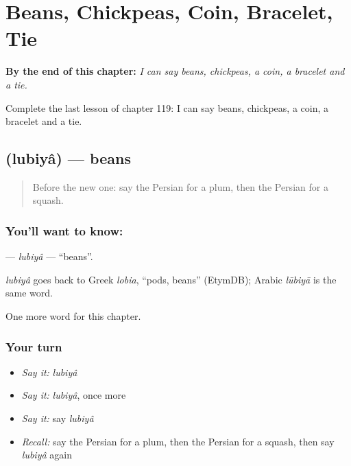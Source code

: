 
\chapter{Beans, Chickpeas, Coin, Bracelet, Tie}
\label{ch:fa-beans-chickpeas-coin-bracelet-tie}

\begin{chapteropening}
\textbf{By the end of this chapter:} \emph{I can say beans, chickpeas, a coin, a bracelet and a tie.}

Complete the last lesson of chapter 119: I can say beans, chickpeas, a coin, a bracelet and a tie.
\end{chapteropening}

\section[\texorpdfstring{\fa{لوبیا} (lubiyâ)}{لوبیا (lubiyâ)}]{ (lubiyâ) — beans}

\label{lesson:FA-C119-lubiya}



\begin{quote}
Before the new one: say the Persian for a plum, then the Persian for a squash.
\end{quote}

\subsection*{You'll want to know: }
\textbf{} — \emph{lubiyâ} — \textquotedblleft{}beans\textquotedblright{}.

\begin{cousinweb}
\emph{lubiyâ} goes back to Greek \emph{lobia}, \textquotedblleft{}pods, beans\textquotedblright{} (EtymDB); Arabic \emph{lūbiyā} is the same word.
\end{cousinweb}

\begin{grammarlens}[title={What you've built}]
One more word for this chapter.
\end{grammarlens}

\subsection*{Your turn}
\begin{itemize}
\raggedright
  \item \emph{Say it:} \emph{lubiyâ}
  \item \emph{Say it:} \emph{lubiyâ}, once more
  \item \emph{Say it:} say \emph{lubiyâ}
  \item \emph{Recall:} say the Persian for a plum, then the Persian for a squash, then say \emph{lubiyâ} again
\end{itemize}


